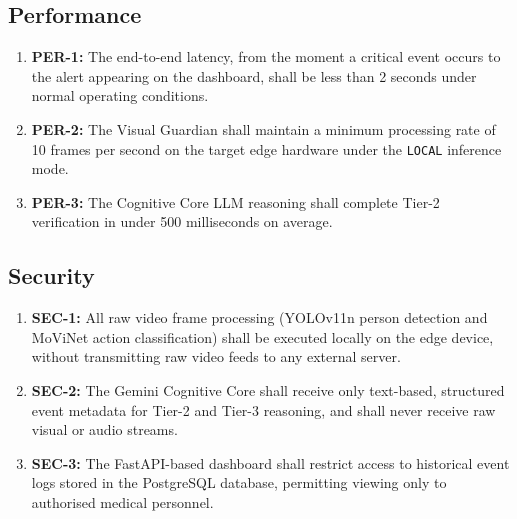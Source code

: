 \subsection{Performance}
\begin{enumerate}
    \item \textbf{PER-1:} The end-to-end latency, from the moment a critical event
    occurs to the alert appearing on the dashboard, shall be less than 2 seconds
    under normal operating conditions.
    \item \textbf{PER-2:} The Visual Guardian shall maintain a minimum processing
    rate of 10 frames per second on the target edge hardware under the
    \texttt{LOCAL} inference mode.
    \item \textbf{PER-3:} The Cognitive Core LLM reasoning shall complete Tier-2
    verification in under 500 milliseconds on average.
\end{enumerate}

\subsection{Security}
\begin{enumerate}
    \item \textbf{SEC-1:} All raw video frame processing (YOLOv11n person detection
    and MoViNet action classification) shall be executed locally on the edge device,
    without transmitting raw video feeds to any external server.
    \item \textbf{SEC-2:} The Gemini Cognitive Core shall receive only text-based,
    structured event metadata for Tier-2 and Tier-3 reasoning, and shall never
    receive raw visual or audio streams.
    \item \textbf{SEC-3:} The FastAPI-based dashboard shall restrict access to
    historical event logs stored in the PostgreSQL database, permitting viewing
    only to authorised medical personnel.
\end{enumerate}
